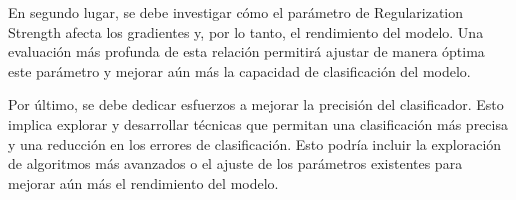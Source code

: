 \documentclass[twoside,10pt]{article}
\numberwithin{equation}{section}
\begin{document}
En segundo lugar, se debe investigar cómo el parámetro de Regularization Strength afecta los gradientes y, por lo tanto, el rendimiento del modelo. Una evaluación más profunda de esta relación permitirá ajustar de manera óptima este parámetro y mejorar aún más la capacidad de clasificación del modelo.

Por último, se debe dedicar esfuerzos a mejorar la precisión del clasificador. Esto implica explorar y desarrollar técnicas que permitan una clasificación más precisa y una reducción en los errores de clasificación. Esto podría incluir la exploración de algoritmos más avanzados o el ajuste de los parámetros existentes para mejorar aún más el rendimiento del modelo.




\bigskip





\end{document}
